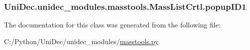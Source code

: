 \subsubsection[{popup\+I\+D1}]{\setlength{\rightskip}{0pt plus 5cm}Uni\+Dec.\+unidec\+\_\+modules.\+masstools.\+Mass\+List\+Crtl.\+popup\+I\+D1}\label{class_uni_dec_1_1unidec__modules_1_1masstools_1_1_mass_list_crtl_a824de3351a3b5816b768200776563a44}


The documentation for this class was generated from the following file\+:\begin{DoxyCompactItemize}
\item 
C\+:/\+Python/\+Uni\+Dec/unidec\+\_\+modules/\hyperlink{masstools_8py}{masstools.\+py}\end{DoxyCompactItemize}
